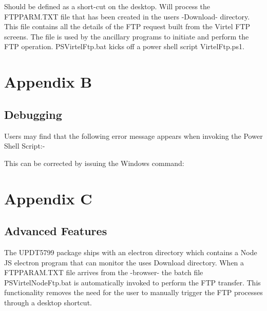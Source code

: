 \documentclass[letterpaper,10pt,english]{sphinxmanual}
\begin{document}
Should be defined as a short-cut on the desktop. Will process the FTPPARM.TXT file that has been created in the users -Download- directory. This file contains all the details of the FTP request built from the Virtel FTP screens. The file is used by the ancillary programs to initiate and perform the FTP operation. PSVirtelFtp.bat kicks off a power shell script VirtelFtp.ps1.

\begin{sphinxVerbatim}[commandchars=\\\{\}]
 
 \PYGZbs{}\PYGZbs{} \PYGZbs{}\PYGZbs{}
      
  \PYGZbs{}\PYGZbs{}
\end{sphinxVerbatim}


\chapter{Appendix B}
\label{\detokenize{TN201905:appendix-b}}

\section{Debugging}
\label{\detokenize{TN201905:debugging}}

Users may find that the following error message appears when invoking the Power Shell Script:-


This can be corrected by issuing the Windows command: 


\chapter{Appendix C}
\label{\detokenize{TN201905:appendix-c}}

\section{Advanced Features}
\label{\detokenize{TN201905:advanced-features}}
The UPDT5799 package ships with an electron directory which contains a Node JS electron program that can monitor the uses Download directory. When a FTPPARAM.TXT file arrives from the -browser- the batch file PSVirtelNodeFtp.bat is automatically invoked to perform the FTP transfer. This functionality removes the need for the user to manually trigger the FTP processes through a desktop shortcut.
\end{document}
